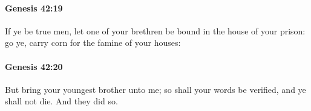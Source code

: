 		\paragraph{Genesis 42:19} %
			\label{GENESIS-42-19}

			If ye be true men, let one of your brethren be bound in the house of your prison: go ye, carry corn for the famine of your houses:


		\paragraph{Genesis 42:20} %
			\label{GENESIS-42-20}

			But bring your youngest brother unto me; so shall your words be verified, and ye shall not die. And they did so.


